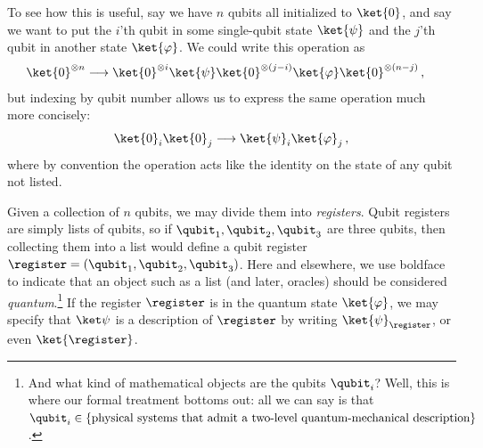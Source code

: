     To see how this is useful, say we have $n$ qubits all initialized to $\ket{0}$,
      and say we want to put the $i$'th qubit in some single-qubit state $\ket{\psi}$ and the
      $j$'th qubit in another state $\ket{\varphi}$. We could write this
      operation as
    \begin{align*}
      \ket{0}^{\otimes n} 
      &\longrightarrow 
      \ket{0}^{\otimes i} \ket{\psi} 
      \ket{0}^{\otimes (j-i)} \ket{\varphi} 
      \ket{0}^{\otimes (n-j)}\, ,
    \end{align*}
    but indexing by qubit number allows us to express the same operation much more
    concisely:
    \[
      \ket{0}_i \ket{0}_j \longrightarrow \ket{\psi}_i \ket{\varphi}_j\, ,
    \]
    where by convention the operation acts like the identity on the state of any
    qubit not listed.

    Given a collection of $n$ qubits, 
      we may divide them into \emph{registers}.
      Qubit registers are simply lists of
      qubits, so if $\qubit_1, \qubit_2, \qubit_3$ are three qubits,
      then collecting them into a list would define a qubit register 
      $\register = (\qubit_1, \qubit_2, \qubit_3)$.
      Here and elsewhere, we use boldface to indicate that an object such as a
      list (and later, oracles) should be considered \emph{quantum}.\footnote{
        And what kind of mathematical objects are the qubits $\qubit_i$? Well, this
        is where our formal treatment bottoms out: all we can say is that
        $
          \qubit_i \in \{ \text{physical systems that admit a two-level quantum-mechanical description} \}
        $.
      }
      If the register $\register$ is in the quantum state $\ket{\varphi}$,
      we may specify that $\ket\psi$ is a description of $\register$ by writing
      $\ket{\psi}_{\register}$, or even $\ket{\register}$.

